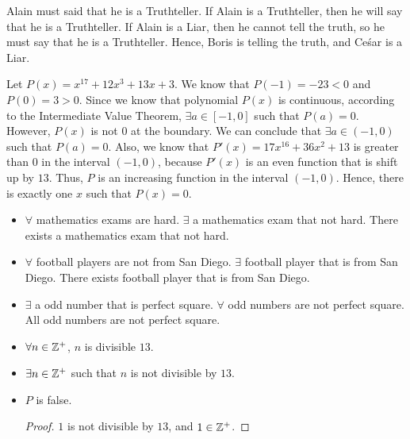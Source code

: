\documentclass[8pt]{article}
\begin{document}
\begin{Answer}[number=2.2.14]
  Alain must said that he is a Truthteller. If Alain is a Truthteller, then
  he will say that he is a Truthteller. If Alain is a Liar, then he cannot
  tell the truth, so he must say that he is a Truthteller. Hence, Boris is
  telling the truth, and Ce\'sar is a Liar.
\end{Answer}

\begin{Answer}[number=2.2.18]
  Let $P(x) = x^{17}+12x^3+13x+3$. We know that $P(-1)=-23<0$ and $P(0)=3>0$.
  Since we know that polynomial $P(x)$ is continuous, according to the
  Intermediate Value Theorem, $\exists a \in [-1,0]$ such that $P(a) = 0$.
  However, $P(x)$ is not $0$ at the boundary. We can conclude that $\exists a
  \in (-1,0)$ such that $P(a) = 0$. Also, we know that $P'(x) = 17x^{16} +
  36x^2+13$ is greater than $0$ in the interval $(-1,0)$, because $P'(x)$ is an
  even function that is shift up by $13$. Thus, $P$ is an increasing function in
  the interval $(-1,0)$. Hence, there is exactly one $x$ such that $P(x)=0$.
\end{Answer}

\begin{Answer}[number=2.3.1]
  \begin{itemize}
    \item $\forall$ mathematics exams are hard. $\exists$ a mathematics exam
      that not hard. There exists a mathematics exam that not hard.
    \item $\forall$ football players are not from San Diego. $\exists$ football
      player that is from San Diego. There exists football player that is from
      San Diego.
    \item $\exists$ a odd number that is perfect square. $\forall$ odd numbers
      are not perfect square. All odd numbers are not perfect square.
  \end{itemize}
\end{Answer}

\begin{Answer}[number=2.3.2]
  \begin{itemize}
    \item $\forall n \in \mathbb{Z}^+$, $n$ is divisible $13$.
    \item $\exists n \in \mathbb{Z}^+$ such that $n$ is not divisible by $13$.
    \item $P$ is false.
      \begin{proof}
        $1$ is not divisible by $13$, and $1\in\mathbb{Z}^+$.
      \end{proof}
  \end{itemize}
\end{Answer}
\end{document}
